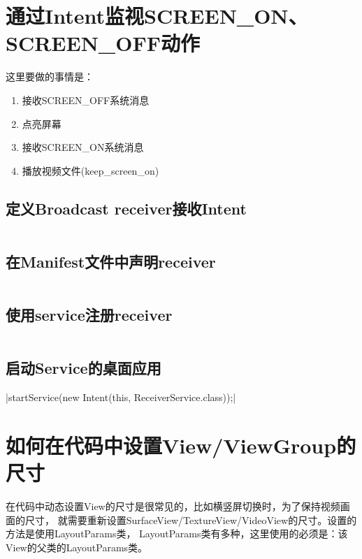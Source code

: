 ﻿\documentclass[a4paper,10pt]{article}
\begin{document}
  \section[通过Intent监视SCREEN\_ON、SCREEN\_OFF动作]{通过Intent监视SCREEN\_ON、SCREEN\_OFF动作}
  这里要做的事情是：
  \begin{enumerate}
    \item 接收SCREEN\_OFF系统消息
    \item 点亮屏幕
    \item 接收SCREEN\_ON系统消息
    \item 播放视频文件(keep\_screen\_on)
  \end{enumerate}
  \subsection[定义Broadcast receiver接收Intent]{定义Broadcast receiver接收Intent}
  \inputminted[linenos,tabsize=4,bgcolor=srcbg]{java}{ScreenBroadcastReceiver.java}

  \subsection[在Manifest文件中声明receiver]{在Manifest文件中声明receiver}
  \inputminted[linenos,tabsize=4,bgcolor=srcbg]{xml}{AndroidManifest.xml}

  \subsection[使用service注册receiver]{使用service注册receiver}
  \inputminted[linenos,tabsize=4,bgcolor=srcbg]{java}{ReceiverService.java}

  \subsection[启动Service的桌面应用]{启动Service的桌面应用}
  |startService(new Intent(this, ReceiverService.class));|


  \section[如何在代码中设置View/ViewGroup的尺寸]{如何在代码中设置View/ViewGroup的尺寸}
  在代码中动态设置View的尺寸是很常见的，比如横竖屏切换时，为了保持视频画面的尺寸，
  就需要重新设置SurfaceView/TextureView/VideoView的尺寸。设置的方法是使用LayoutParams类，
  LayoutParams类有多种，这里使用的必须是：该View的父类的LayoutParams类。
\end{document}
